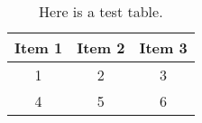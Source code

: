 \documentclass[draft, masters]{csuthesis} %
\begin{document}
%
%
%
%
%
\begin{table}[htp]
\caption[Test table]{Here is a test table.}
\label{table:faketable}
\begin{tabular}{|c|c|c|}
\hline
Item 1 & Item 2 & Item 3\\
\hline
1 & 2 & 3 \\
4 & 5 & 6 \\
\hline
\end{tabular}
\end{table}
%
%
\end{document}
